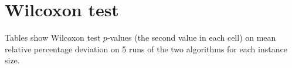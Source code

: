 \newpage\cleardoublepage{}
\section{Wilcoxon test}
\label{app:stat}

Tables show Wilcoxon test $p$-values (the second value in each cell) on mean relative percentage deviation on 5 runs of the two algorithms for each instance size. 